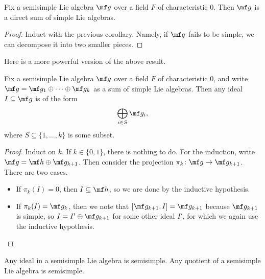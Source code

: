 \documentclass[../notes.tex]{subfiles}
\begin{document}
\begin{corollary}
	Fix a semisimple Lie algebra $\mf g$ over a field $F$ of characteristic $0$. Then $\mf g$ is a direct sum of simple Lie algebras.
\end{corollary}
\begin{proof}
	Induct with the previous corollary. Namely, if $\mf g$ fails to be simple, we can decompose it into two smaller pieces.
\end{proof}
Here is a more powerful version of the above result.
\begin{proposition}
	Fix a semisimple Lie algebra $\mf g$ over a field $F$ of characteristic $0$, and write $\mf g=\mf g_1\oplus\cdots\oplus\mf g_k$ as a sum of simple Lie algebras. Then any ideal $I\subseteq\mf g$ is of the form
	\[\bigoplus_{i\in S}\mf g_i,\]
	where $S\subseteq\{1,\ldots,k\}$ is some subset.
\end{proposition}
\begin{proof}
	Induct on $k$. If $k\in\{0,1\}$, there is nothing to do. For the induction, write $\mf g=\mf h\oplus\mf g_{k+1}$. Then consider the projection $\pi_k\colon\mf g\to\mf g_{k+1}$. There are two cases.
	\begin{itemize}
		\item If $\pi_k(I)=0$, then $I\subseteq\mf h$, so we are done by the inductive hypothesis.
		\item If $\pi_k(I)=\mf g_k$, then we note that $[\mf g_{k+1},I]=\mf g_{k+1}$ because $\mf g_{k+1}$ is simple, so $I=I'\oplus\mf g_{k+1}$ for some other ideal $I'$, for which we again use the inductive hypothesis.
		\qedhere
	\end{itemize} 
\end{proof}
\begin{corollary}
	Any ideal in a semisimple Lie algebra is semisimple. Any quotient of a semisimple Lie algebra is semisimple.
\end{corollary}
\end{document}
